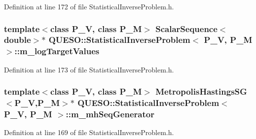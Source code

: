 Definition at line 172 of file Statistical\-Inverse\-Problem.\-h.

\hypertarget{class_q_u_e_s_o_1_1_statistical_inverse_problem_aa84ebc22eac5f609d5e269a9ed25c6aa}{
\subsubsection[{m\-\_\-log\-Target\-Values}]{\setlength{\rightskip}{0pt plus 5cm}template$<$class P\-\_\-\-V, class P\-\_\-\-M$>$ {\bf Scalar\-Sequence}$<$double$>$$\ast$ {\bf Q\-U\-E\-S\-O\-::\-Statistical\-Inverse\-Problem}$<$ P\-\_\-\-V, P\-\_\-\-M $>$\-::m\-\_\-log\-Target\-Values\hspace{0.3cm}{\ttfamily [private]}}}\label{class_q_u_e_s_o_1_1_statistical_inverse_problem_aa84ebc22eac5f609d5e269a9ed25c6aa}


Definition at line 173 of file Statistical\-Inverse\-Problem.\-h.

\hypertarget{class_q_u_e_s_o_1_1_statistical_inverse_problem_af66c3780c9b23fc917dca0ea6dc12103}{
\subsubsection[{m\-\_\-mh\-Seq\-Generator}]{\setlength{\rightskip}{0pt plus 5cm}template$<$class P\-\_\-\-V, class P\-\_\-\-M$>$ {\bf Metropolis\-Hastings\-S\-G}$<$P\-\_\-\-V,P\-\_\-\-M$>$$\ast$ {\bf Q\-U\-E\-S\-O\-::\-Statistical\-Inverse\-Problem}$<$ P\-\_\-\-V, P\-\_\-\-M $>$\-::m\-\_\-mh\-Seq\-Generator\hspace{0.3cm}{\ttfamily [private]}}}\label{class_q_u_e_s_o_1_1_statistical_inverse_problem_af66c3780c9b23fc917dca0ea6dc12103}


Definition at line 169 of file Statistical\-Inverse\-Problem.\-h.

